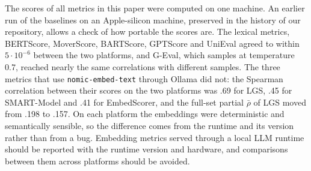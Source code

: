 The scores of all metrics in this paper were computed on one machine. An earlier run of the baselines on an Apple-silicon machine, preserved in the history of our repository, allows a check of how portable the scores are. The lexical metrics, BERTScore, MoverScore, BARTScore, GPTScore and UniEval agreed to within $5\cdot10^{-6}$ between the two platforms, and G-Eval, which samples at temperature 0.7, reached nearly the same correlations with different samples. The three metrics that use \texttt{nomic-embed-text} through Ollama did not: the Spearman correlation between their scores on the two platforms was .69 for LGS, .45 for SMART-Model and .41 for EmbedScorer, and the full-set partial $\bar\rho$ of LGS moved from .198 to .157. On each platform the embeddings were deterministic and semantically sensible, so the difference comes from the runtime and its version rather than from a bug. Embedding metrics served through a local LLM runtime should be reported with the runtime version and hardware, and comparisons between them across platforms should be avoided.
